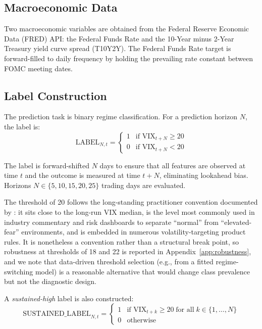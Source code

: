 \documentclass[12pt]{article}
\begin{document}
\subsection{Macroeconomic Data}

Two macroeconomic variables are obtained from the Federal Reserve Economic Data (FRED) API: the
Federal Funds Rate and the 10-Year minus 2-Year Treasury yield curve spread (T10Y2Y). The Federal
Funds Rate target is forward-filled to daily frequency by holding the prevailing rate constant
between FOMC meeting dates.

\subsection{Label Construction}

The prediction task is binary regime classification. For a prediction horizon $N$, the label is:
\begin{equation}
    \text{LABEL}_{N,t} = \begin{cases} 1 & \text{if } \text{VIX}_{t+N} \geq 20 \\ 0 & \text{if } \text{VIX}_{t+N} < 20 \end{cases}
    \label{eq:label}
\end{equation}

The label is forward-shifted $N$ days to ensure that all features are observed at time $t$ and
the outcome is measured at time $t + N$, eliminating lookahead bias. Horizons
$N \in \{5, 10, 15, 20, 25\}$ trading days are evaluated.

The threshold of 20 follows the long-standing practitioner convention documented by
\citet{whaley2009}: it sits close to the long-run VIX median, is the level most commonly used
in industry commentary and risk dashboards to separate ``normal'' from ``elevated-fear''
environments, and is embedded in numerous volatility-targeting product rules. It is
nonetheless a convention rather than a structural break point, so robustness at thresholds of
18 and 22 is reported in Appendix~\ref{app:robustness}, and we note that data-driven threshold
selection (e.g., from a fitted regime-switching model) is a reasonable alternative that would
change class prevalence but not the diagnostic design.

A \emph{sustained-high} label is also constructed:
\begin{equation}
    \text{SUSTAINED\_LABEL}_{N,t} = \begin{cases} 1 & \text{if } \text{VIX}_{t+k} \geq 20 \;\text{for all}\; k \in \{1, \ldots, N\} \\ 0 & \text{otherwise} \end{cases}
    \label{eq:sustained}
\end{equation}
\end{document}
